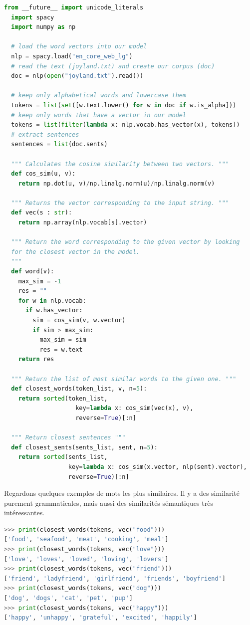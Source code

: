\documentclass[11pt, a4paper]{report}
\begin{document}
\begin{lstlisting}[language=Python]
  from __future__ import unicode_literals
  import spacy 
  import numpy as np 

  # load the word vectors into our model 
  nlp = spacy.load("en_core_web_lg")
  # read the text (joyland.txt) and create our corpus (doc)
  doc = nlp(open("joyland.txt").read())

  # keep only alphabetical words and lowercase them 
  tokens = list(set([w.text.lower() for w in doc if w.is_alpha]))
  # keep only words that have a vector in our model 
  tokens = list(filter(lambda x: nlp.vocab.has_vector(x), tokens))
  # extract sentences
  sentences = list(doc.sents)

  """ Calculates the cosine similarity between two vectors. """
  def cos_sim(u, v):
    return np.dot(u, v)/np.linalg.norm(u)/np.linalg.norm(v)

  """ Returns the vector corresponding to the input string. """
  def vec(s : str):
    return np.array(nlp.vocab[s].vector)

  """ Return the word corresponding to the given vector by looking 
  for the closest vector in the model.
  """
  def word(v):
    max_sim = -1 
    res = ""
    for w in nlp.vocab:
      if w.has_vector:
        sim = cos_sim(v, w.vector)
        if sim > max_sim:
          max_sim = sim 
          res = w.text
    return res  

  """ Return the list of most similar words to the given one. """
  def closest_words(token_list, v, n=5):
    return sorted(token_list, 
                    key=lambda x: cos_sim(vec(x), v), 
                    reverse=True)[:n]

  """ Return closest sentences """
  def closest_sents(sents_list, sent, n=5):
    return sorted(sents_list, 
                  key=lambda x: cos_sim(x.vector, nlp(sent).vector), 
                  reverse=True)[:n]
\end{lstlisting}

Regardons quelques exemples de mots les plus similaires. Il y a des similarité 
purement grammaticales, mais aussi des similarités sémantiques très intéressantes.
\begin{lstlisting}[language=Python]
  >>> print(closest_words(tokens, vec("food")))
['food', 'seafood', 'meat', 'cooking', 'meal']
>>> print(closest_words(tokens, vec("love")))
['love', 'loves', 'loved', 'loving', 'lovers']
>>> print(closest_words(tokens, vec("friend")))
['friend', 'ladyfriend', 'girlfriend', 'friends', 'boyfriend']
>>> print(closest_words(tokens, vec("dog")))
['dog', 'dogs', 'cat', 'pet', 'pup']
>>> print(closest_words(tokens, vec("happy")))
['happy', 'unhappy', 'grateful', 'excited', 'happily']
\end{lstlisting}  
\end{document}
